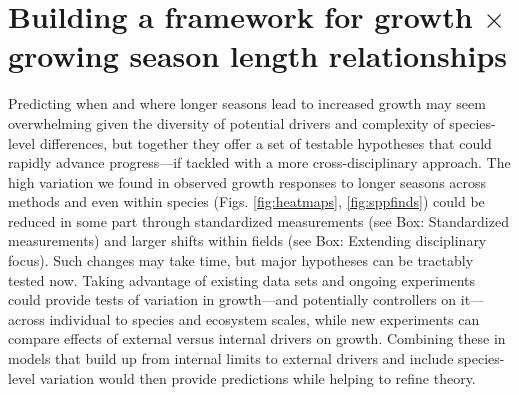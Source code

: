 \documentclass[11pt]{article}
\begin{document}
\section*{Building a framework for growth $\times$ growing season length relationships} %
Predicting when and where longer seasons lead to increased growth may seem overwhelming given the diversity of potential drivers and complexity of species-level differences, but together they offer a set of testable hypotheses that could rapidly advance progress---if tackled with a more cross-disciplinary approach. The high variation we found in observed growth responses to longer seasons across methods and even within species (Figs. \ref{fig:heatmaps}, \ref{fig:sppfinds}) could be reduced in some part through standardized measurements (see Box: Standardized measurements) and larger shifts within fields (see Box: Extending disciplinary focus). Such changes may take time, but major hypotheses can be tractably tested now. Taking advantage of existing data sets and ongoing experiments could provide tests of variation in growth---and potentially controllers on it---across individual to species and ecosystem scales, while new experiments can compare effects of external versus internal drivers on growth. Combining these in models that build up from internal limits to external drivers and include species-level variation would then provide predictions while helping to refine theory. 

\end{document}

